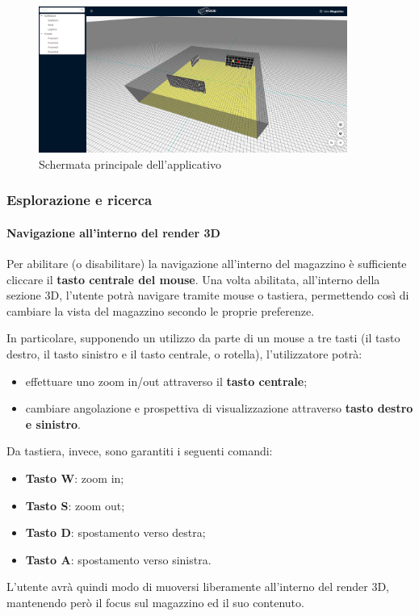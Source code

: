         \begin{figure}[h!]
            \centering
            \includegraphics[width=0.9\textwidth]{images/schermata_principale.png}
            \caption{Schermata principale dell'applicativo}
        \end{figure}

        \subsubsection{Esplorazione e ricerca}\label{sec:principale:esplorare}
            \paragraph{Navigazione all'interno del render 3D} \label{sec:principale:esplorare:navigare}
               Per abilitare (o disabilitare) la navigazione all'interno del magazzino è sufficiente cliccare il \textbf{tasto centrale del mouse}. 
               Una volta abilitata, all'interno della sezione 3D, l'utente potrà navigare tramite mouse o tastiera, permettendo così di cambiare la vista del magazzino secondo le proprie preferenze.
               
                In particolare, supponendo un utilizzo da parte di un mouse a tre tasti (il tasto destro, il tasto sinistro e il tasto centrale, o rotella), l'utilizzatore potrà:
                \begin{itemize}
                    \item effettuare uno zoom in/out attraverso il \textbf{tasto centrale};
                    \item cambiare angolazione e prospettiva di visualizzazione attraverso \textbf{tasto destro e sinistro}.
                \end{itemize}
                Da tastiera, invece, sono garantiti i seguenti comandi: 
                \begin{itemize}
                    \item \textbf{Tasto W}: zoom in;
                    \item \textbf{Tasto S}: zoom out;
                    \item \textbf{Tasto D}: spostamento verso destra;
                    \item \textbf{Tasto A}: spostamento verso sinistra.
                \end{itemize}
                L'utente avrà quindi modo di muoversi liberamente all'interno del render 3D, mantenendo però il focus sul magazzino ed il suo contenuto. 

